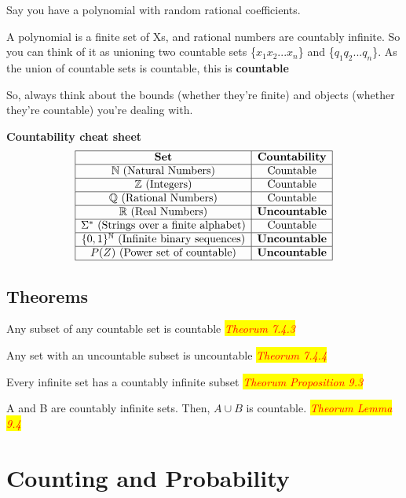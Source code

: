 \documentclass{article}
\newcommand{\theorum}[1]{\quad \quad \colorbox{yellow}{\textit{\textcolor{red}{Theorum #1}}}}
\newcommand{\sub}[1]{\vspace{10pt}\textbf{#1}}
\newcommand{\sbreak}{\vspace{10pt}}
\begin{document}
Say you have a polynomial with random rational coefficients.

\sbreak

A polynomial is a finite set of Xs, and rational numbers are countably infinite. So you can think of it as unioning two countable sets \{$x_1 x_2 ... x_n$\} and \{$q_1 q_2 ... q_n$\}. As the union of countable sets is countable, this is \textbf{countable}

\sbreak

So, always think about the bounds (whether they're finite) and objects (whether they're countable) you're dealing with.

\sub{Countability cheat sheet}
\[
\begin{array}{|c|c|}
\hline
\textbf{Set} & \textbf{Countability} \\ \hline
\mathbb{N} \text{ (Natural Numbers)} & \text{Countable} \\ \hline
\mathbb{Z} \text{ (Integers)} & \text{Countable} \\ \hline
\mathbb{Q} \text{ (Rational Numbers)} & \text{Countable} \\ \hline
\mathbb{R} \text{ (Real Numbers)} & \text{\textbf{Uncountable}} \\ \hline
\Sigma^* \text{ (Strings over a finite alphabet)} & \text{Countable} \\ \hline
\{0,1\}^\mathbb{N} \text{ (Infinite binary sequences)} & \text{\textbf{Uncountable}} \\ \hline
P(Z) \text{ (Power set of countable)} & \text{\textbf{Uncountable}} \\ \hline
\end{array}
\]


\subsection{Theorems}
Any subset of any countable set is countable \theorum{7.4.3}

Any set with an uncountable subset is uncountable \theorum{7.4.4}

Every infinite set has a countably infinite subset \theorum{Proposition 9.3}

A and B are countably infinite sets. Then, $A\cup B$ is countable. \theorum{Lemma 9.4}

\section{Counting and Probability}
\end{document}
